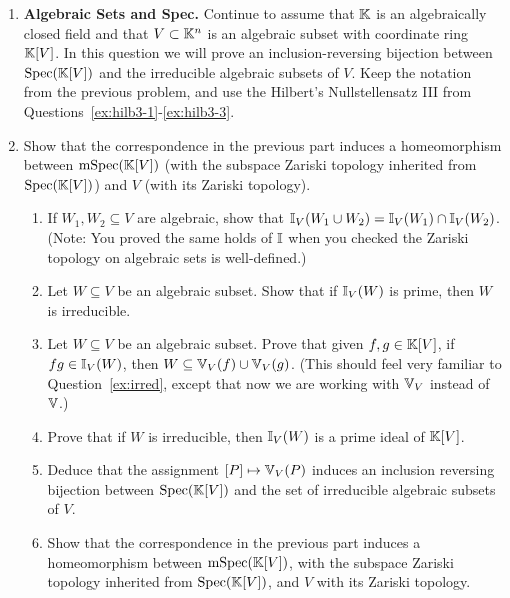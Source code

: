 \documentclass[12pt,reqno]{amsart}
\begin{document}
\begin{enumerate}[leftmargin=*]
\item \textbf{Algebraic Sets and Spec.} Continue to assume that $\mathbb{K}$ is an algebraically closed field and that $V \subset \mathbb{K}^n$ is an algebraic subset with coordinate ring $\mathbb{K}[V]$. In this question we will prove an inclusion-reversing bijection between $\operatorname{Spec}(\mathbb{K}[V])$ and the irreducible algebraic subsets of $V$. Keep the notation from the previous problem, and use the Hilbert's Nullstellensatz III from Questions~\ref{ex:hilb3-1}-\ref{ex:hilb3-3}.

\item Show that the correspondence in the previous part induces a homeomorphism between $\operatorname{mSpec}(\mathbb{K}[V])$ (with the subspace Zariski topology inherited from $\operatorname{Spec}(\mathbb{K}[V])$) and $V$ (with its Zariski topology).
\begin{enumerate}[label=(\alph*),ref=\theenumi\alph*]
\item If $W_1,W_2\subseteq V$ are algebraic, show that $\mathbb{I}_V(W_1\cup W_2)=\mathbb{I}_V(W_1)\cap \mathbb{I}_V(W_2)$. (Note: You proved the same holds of $\mathbb{I}$ when you checked the Zariski topology on algebraic sets is well-defined.)

\item Let $W\subseteq V$ be an algebraic subset. Show that if $\mathbb{I}_V(W)$ is prime, then $W$ is irreducible.

\item Let $W\subseteq V$ be an algebraic subset. Prove that given $f,g\in \mathbb{K}[V]$, if $fg\in \mathbb{I}_V(W)$, then $W\subseteq \mathbb{V}_V(f)\cup \mathbb{V}_V(g)$. (This should feel very familiar to Question~\ref{ex:irred}, except that now we are working with $\mathbb{V}_V$ instead of $\mathbb{V}$.)

\item Prove that if $W$ is irreducible, then $\mathbb{I}_V(W)$ is a prime ideal of $\mathbb{K}[V]$.

\item\label{ex-pt:alg-set-spec}  Deduce that the assignment $[P] \mapsto \mathbb{V}_V(P)$ induces an inclusion reversing bijection between $\operatorname{Spec}(\mathbb{K}[V])$ and the set of irreducible algebraic subsets of $V$.  


\item Show that the correspondence in the previous part induces a homeomorphism between $\operatorname{mSpec}(\mathbb{K}[V])$, with the subspace Zariski topology inherited from $\operatorname{Spec}(\mathbb{K}[V])$, and $V$ with its Zariski topology.
\end{enumerate}


\end{enumerate}
\end{document}
